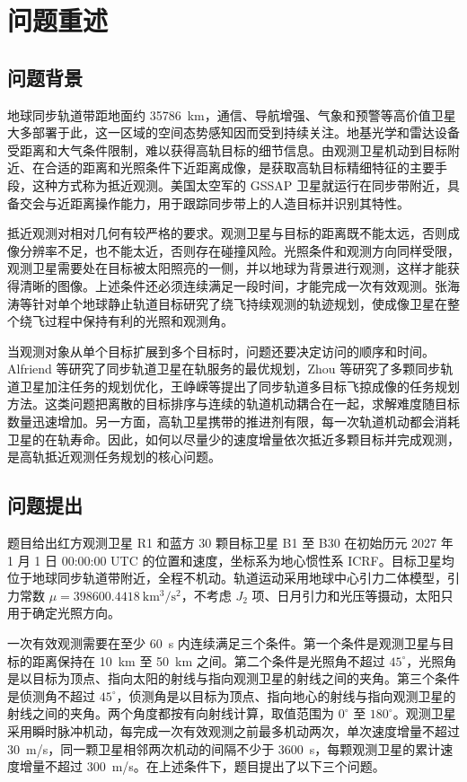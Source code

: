 \section{问题重述}

\subsection{问题背景}

地球同步轨道带距地面约 35786~km，通信、导航增强、气象和预警等高价值卫星大多部署于此，这一区域的空间态势感知因而受到持续关注。地基光学和雷达设备受距离和大气条件限制，难以获得高轨目标的细节信息。由观测卫星机动到目标附近、在合适的距离和光照条件下近距离成像，是获取高轨目标精细特征的主要手段，这种方式称为抵近观测。美国太空军的 GSSAP 卫星就运行在同步带附近，具备交会与近距离操作能力，用于跟踪同步带上的人造目标并识别其特性\cite{gssap}。

抵近观测对相对几何有较严格的要求。观测卫星与目标的距离既不能太远，否则成像分辨率不足，也不能太近，否则存在碰撞风险。光照条件和观测方向同样受限，观测卫星需要处在目标被太阳照亮的一侧，并以地球为背景进行观测，这样才能获得清晰的图像。上述条件还必须连续满足一段时间，才能完成一次有效观测。张海涛等针对单个地球静止轨道目标研究了绕飞持续观测的轨迹规划，使成像卫星在整个绕飞过程中保持有利的光照和观测角\cite{zhang2024}。

当观测对象从单个目标扩展到多个目标时，问题还要决定访问的顺序和时间。Alfriend 等研究了同步轨道卫星在轨服务的最优规划\cite{alfriend2006}，Zhou 等研究了多颗同步轨道卫星加注任务的规划优化\cite{zhou2015}，王峥嵘等提出了同步轨道多目标飞掠成像的任务规划方法\cite{wang2025}。这类问题把离散的目标排序与连续的轨道机动耦合在一起，求解难度随目标数量迅速增加。另一方面，高轨卫星携带的推进剂有限，每一次轨道机动都会消耗卫星的在轨寿命。因此，如何以尽量少的速度增量依次抵近多颗目标并完成观测，是高轨抵近观测任务规划的核心问题。

\subsection{问题提出}

题目给出红方观测卫星 R1 和蓝方 30 颗目标卫星 B1 至 B30 在初始历元 2027 年 1 月 1 日 00:00:00 UTC 的位置和速度，坐标系为地心惯性系 ICRF。目标卫星均位于地球同步轨道带附近，全程不机动。轨道运动采用地球中心引力二体模型，引力常数 $\mu = 398600.4418~\mathrm{km^3/s^2}$，不考虑 $J_2$ 项、日月引力和光压等摄动，太阳只用于确定光照方向。

一次有效观测需要在至少 60~s 内连续满足三个条件。第一个条件是观测卫星与目标的距离保持在 10~km 至 50~km 之间。第二个条件是光照角不超过 $45^\circ$，光照角是以目标为顶点、指向太阳的射线与指向观测卫星的射线之间的夹角。第三个条件是侦测角不超过 $45^\circ$，侦测角是以目标为顶点、指向地心的射线与指向观测卫星的射线之间的夹角。两个角度都按有向射线计算，取值范围为 $0^\circ$ 至 $180^\circ$。观测卫星采用瞬时脉冲机动，每完成一次有效观测之前最多机动两次，单次速度增量不超过 30~m/s，同一颗卫星相邻两次机动的间隔不少于 3600~s，每颗观测卫星的累计速度增量不超过 300~m/s。在上述条件下，题目提出了以下三个问题。

